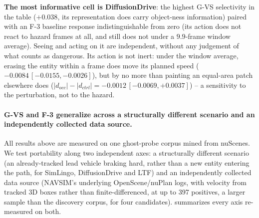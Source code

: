 \textbf{The most informative cell is DiffusionDrive}: the highest G-VS selectivity in the
table ($+0.038$, its representation does carry object-ness information) paired with an F-3
baseline response indistinguishable from zero (its action does not react to hazard frames
at all, and still does not under a $9.9$-frame window average). Seeing and acting on it are
independent, without any judgement of what counts as dangerous. Its action is not inert:
under the window average, erasing the entity within a frame does move its planned speed
($-0.0084\,[-0.0155,-0.0026]$), but by no more than painting an equal-area patch elsewhere
does ($\lvert d_{occ}\rvert-\lvert d_{ctrl}\rvert = -0.0012\,[-0.0069,+0.0037]$) -- a
sensitivity to the perturbation, not to the hazard.

\paragraph{G-VS and F-3 generalize across a structurally different scenario and an
independently collected data source.} All results above are measured on one ghost-probe
corpus mined from nuScenes. We test portability along two independent axes: a
structurally different scenario (an already-tracked lead vehicle braking hard, rather
than a new entity entering the path, for SimLingo, DiffusionDrive and LTF) and an
independently collected data source (NAVSIM's underlying OpenScene/nuPlan logs, with
velocity from tracked 3D boxes rather than finite-differenced, at up to 397 positives, a
larger sample than the discovery corpus, for four candidates). 
summarizes every axis re-measured on both.

